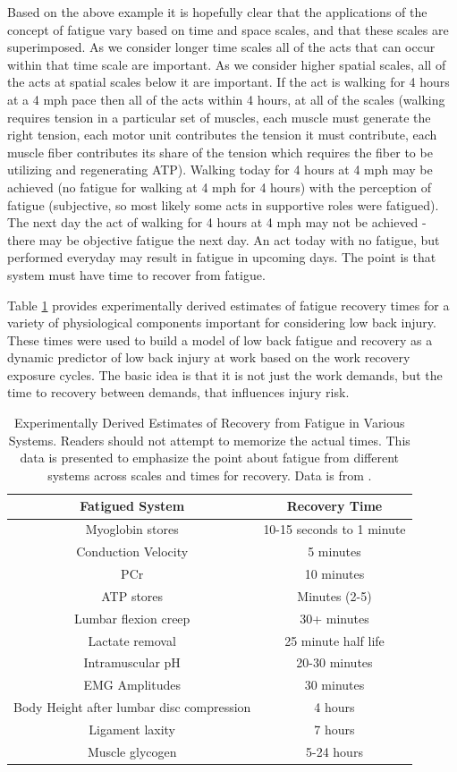 Based on the above example it is hopefully clear that the applications of the concept of fatigue vary based on time and space scales, and that these scales are superimposed. As we consider longer time scales all of the acts that can occur within that time scale are important. As we consider higher spatial scales, all of the acts at spatial scales below it are important. If the act is walking for 4 hours at a 4 mph pace then all of the acts within 4 hours, at all of the scales (walking requires tension in a particular set of muscles, each muscle must generate the right tension, each motor unit contributes the tension it must contribute, each muscle fiber contributes its share of the tension which requires the fiber to be utilizing and regenerating ATP). Walking today for 4 hours at 4 mph may be achieved (no fatigue for walking at 4 mph for 4 hours) with the perception of fatigue (subjective, so most likely some acts in supportive roles were fatigued). The next day the act of walking for 4 hours at 4 mph may not be achieved - there may be objective fatigue the next day. An act today with no fatigue, but performed everyday may result in fatigue in upcoming days. The point is that system must have time to recover from fatigue. 

Table \ref{table:fatigue_recovery} provides experimentally derived estimates of fatigue recovery times for a variety of physiological components important for considering low back injury. These times were used to build a model of low back fatigue and recovery as a dynamic predictor of low back injury at work based on the work recovery exposure cycles. The basic idea is that it is not just the work demands, but the time to recovery between demands, that influences injury risk.

\begin{table}[h!]
\centering
\begin{tabular}{||c c ||} 
 \hline
 Fatigued System & Recovery Time\\ [0.5ex] 
 \hline\hline
 Myoglobin stores & 10-15 seconds to 1 minute \\
 Conduction Velocity  & 5 minutes\\ 
 PCr & 10 minutes  \\
 ATP stores &  Minutes (2-5) \\ 
 Lumbar flexion creep & 30+ minutes \\
 Lactate removal & 25 minute half life \\
 Intramuscular pH & 20-30 minutes \\
 EMG Amplitudes & 30 minutes \\
 Body Height after lumbar disc compression & 4 hours \\
 Ligament laxity & 7 hours \\
 Muscle glycogen & 5-24 hours \\[1ex] 
 \hline
\end{tabular}
\caption{Experimentally Derived Estimates of Recovery from Fatigue in Various Systems. Readers should not attempt to memorize the actual times. This data is presented to emphasize the point about fatigue from different systems across scales and times for recovery. Data is from \cite{krajcarski_time_2008}.}
\label{table:fatigue_recovery}
\end{table}

